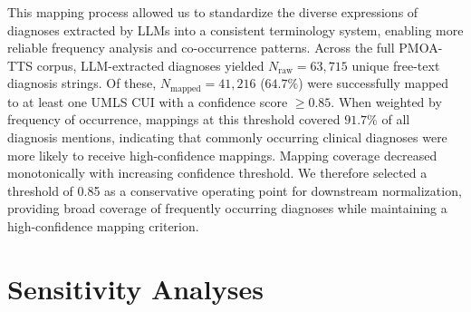 This mapping process allowed us to standardize the diverse expressions of diagnoses extracted by LLMs into a consistent terminology system, enabling more reliable frequency analysis and co-occurrence patterns. 
Across the full PMOA-TTS corpus, LLM-extracted diagnoses yielded
$N_{\text{raw}} = 63{,}715$ unique free-text diagnosis strings.
Of these, $N_{\text{mapped}} = 41{,}216$ ($64.7\%$) were successfully mapped to at least one
UMLS CUI with a confidence score $\ge 0.85$.
When weighted by frequency of occurrence, mappings at this threshold covered
$91.7\%$ of all diagnosis mentions, indicating that commonly occurring clinical
diagnoses were more likely to receive high-confidence mappings.
Mapping coverage decreased monotonically with increasing confidence threshold.
We therefore selected a threshold of 0.85 as a conservative operating point for
downstream normalization, providing broad coverage of frequently occurring diagnoses
while maintaining a high-confidence mapping criterion.


\section{Sensitivity Analyses}
\label{apd:sensitivity-analyses}



